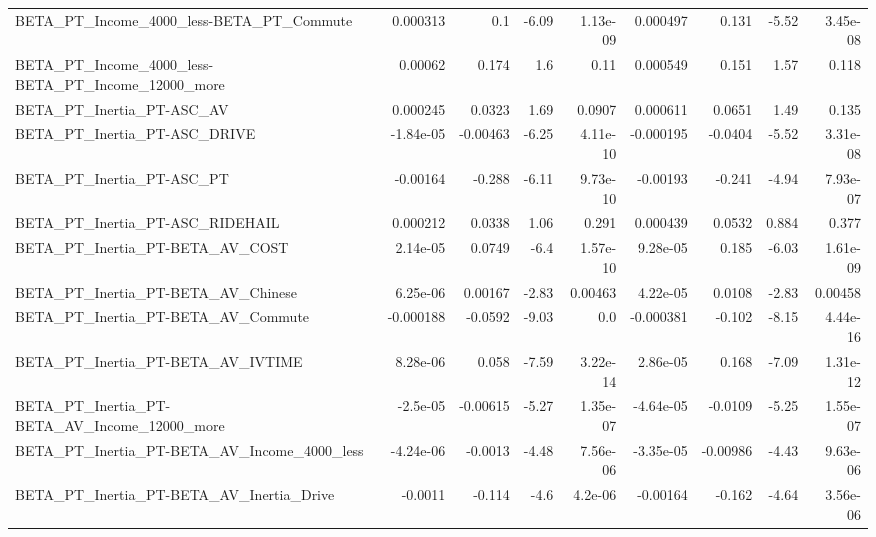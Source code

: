 \begin{tabular}{lrrrrrrrr}
BETA\_PT\_Income\_4000\_less-BETA\_PT\_Commute           &    0.000313 &          0.1 &    -6.09 & 1.13e-09 &   0.000497 &       0.131 &        -5.52 &      3.45e-08 \\
BETA\_PT\_Income\_4000\_less-BETA\_PT\_Income\_12000\_more &     0.00062 &        0.174 &      1.6 &     0.11 &   0.000549 &       0.151 &         1.57 &         0.118 \\
BETA\_PT\_Inertia\_PT-ASC\_AV                          &    0.000245 &       0.0323 &     1.69 &   0.0907 &   0.000611 &      0.0651 &         1.49 &         0.135 \\
BETA\_PT\_Inertia\_PT-ASC\_DRIVE                       &   -1.84e-05 &     -0.00463 &    -6.25 & 4.11e-10 &  -0.000195 &     -0.0404 &        -5.52 &      3.31e-08 \\
BETA\_PT\_Inertia\_PT-ASC\_PT                          &    -0.00164 &       -0.288 &    -6.11 & 9.73e-10 &   -0.00193 &      -0.241 &        -4.94 &      7.93e-07 \\
BETA\_PT\_Inertia\_PT-ASC\_RIDEHAIL                    &    0.000212 &       0.0338 &     1.06 &    0.291 &   0.000439 &      0.0532 &        0.884 &         0.377 \\
BETA\_PT\_Inertia\_PT-BETA\_AV\_COST                    &    2.14e-05 &       0.0749 &     -6.4 & 1.57e-10 &   9.28e-05 &       0.185 &        -6.03 &      1.61e-09 \\
BETA\_PT\_Inertia\_PT-BETA\_AV\_Chinese                 &    6.25e-06 &      0.00167 &    -2.83 &  0.00463 &   4.22e-05 &      0.0108 &        -2.83 &       0.00458 \\
BETA\_PT\_Inertia\_PT-BETA\_AV\_Commute                 &   -0.000188 &      -0.0592 &    -9.03 &      0.0 &  -0.000381 &      -0.102 &        -8.15 &      4.44e-16 \\
BETA\_PT\_Inertia\_PT-BETA\_AV\_IVTIME                  &    8.28e-06 &        0.058 &    -7.59 & 3.22e-14 &   2.86e-05 &       0.168 &        -7.09 &      1.31e-12 \\
BETA\_PT\_Inertia\_PT-BETA\_AV\_Income\_12000\_more       &    -2.5e-05 &     -0.00615 &    -5.27 & 1.35e-07 &  -4.64e-05 &     -0.0109 &        -5.25 &      1.55e-07 \\
BETA\_PT\_Inertia\_PT-BETA\_AV\_Income\_4000\_less        &   -4.24e-06 &      -0.0013 &    -4.48 & 7.56e-06 &  -3.35e-05 &    -0.00986 &        -4.43 &      9.63e-06 \\
BETA\_PT\_Inertia\_PT-BETA\_AV\_Inertia\_Drive           &     -0.0011 &       -0.114 &     -4.6 &  4.2e-06 &   -0.00164 &      -0.162 &        -4.64 &      3.56e-06 \\

\end{tabular}
